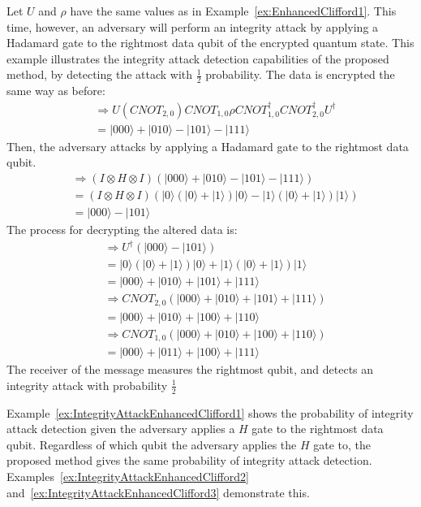\begin{example}
\label{ex:IntegrityAttackEnhancedClifford1}
	Let $U$ and $\rho$ have the same values as in Example~\ref{ex:EnhancedClifford1}. This time, however, an adversary will perform an integrity attack by applying a Hadamard gate to the rightmost data qubit of the encrypted quantum state. This example illustrates the integrity attack detection capabilities of the proposed method, by detecting the attack with $\frac{1}{2}$ probability. The data is encrypted the same way as before:
	\begin{align}
	& \Rightarrow U (\mathit{CNOT}_{2,0})\mathit{CNOT}_{1,0}\rho \mathit{CNOT}_{1,0}^{\dagger}\mathit{CNOT}_{2,0}^{\dagger} U^{\dagger}\\
	&= |000\rangle + |010\rangle - |101\rangle - |111\rangle
	\end{align}
	Then, the adversary attacks by applying a Hadamard gate to the rightmost data qubit.
	\begin{align}
	& \Rightarrow (I \otimes H \otimes I)(|000\rangle + |010\rangle - |101\rangle - |111\rangle)\\
	& = (I \otimes H \otimes I)(|0\rangle(|0\rangle + |1\rangle)|0\rangle - |1\rangle(|0\rangle + |1\rangle)|1\rangle)\\
	&= |000\rangle - |101\rangle
	\end{align}
	The process for decrypting the altered data is:
	\begin{align}
	& \Rightarrow U^{\dagger}(|000\rangle - |101\rangle)\\
	&= |0\rangle(|0\rangle + |1\rangle)|0\rangle + |1\rangle(|0\rangle + |1\rangle)|1\rangle\\
	&= |000\rangle + |010\rangle + |101\rangle + |111\rangle\\ 
	& \Rightarrow \mathit{CNOT}_{2,0} (|000\rangle + |010\rangle + |101\rangle + |111\rangle)\\
	&= |000\rangle + |010\rangle + |100\rangle + |110\rangle\\
	& \Rightarrow \mathit{CNOT}_{1,0} (|000\rangle + |010\rangle + |100\rangle + |110\rangle)\\
	&= |000\rangle + |011\rangle + |100\rangle + |111\rangle
	\end{align}
The receiver of the message measures the rightmost qubit, and detects an integrity attack with probability $\frac{1}{2}$
\end{example}
Example~\ref{ex:IntegrityAttackEnhancedClifford1} shows the probability of integrity attack detection given the adversary applies a $H$ gate to the rightmost data qubit. Regardless of which qubit the adversary applies the $H$ gate to, the proposed method gives the same probability of integrity attack detection. Examples~\ref{ex:IntegrityAttackEnhancedClifford2} and~\ref{ex:IntegrityAttackEnhancedClifford3} demonstrate this.

